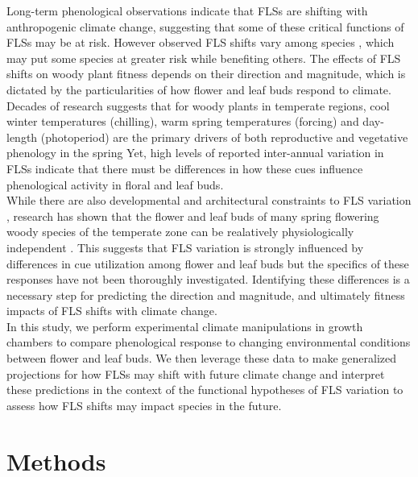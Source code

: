 \documentclass[11pt]{article}
\begin{document}
\noindent Long-term phenological observations indicate that FLSs are shifting with anthropogenic climate change, suggesting that some of these critical functions of FLSs may be at risk. However observed FLS shifts vary among species \citep{Buonaiuto2020}, which may put some species at greater risk while benefiting others. The effects of FLS shifts on woody plant fitness depends on their direction and magnitude, which is dictated by the particularities of how flower and leaf buds respond to climate.\\ 

\noindent Decades of research suggests that for woody plants in temperate regions, cool winter temperatures (chilling), warm spring temperatures (forcing) and day-length (photoperiod) are the primary drivers of both reproductive and vegetative phenology in the spring \citep{Forrest2010,Flynn2018}  Yet, high levels of reported inter-annual variation in FLSs \citep{Buonaiuto2020} indicate that there must be differences in how these cues influence phenological activity in floral and leaf buds.\\
 
\noindent While there are also developmental and architectural constraints to FLS variation \citep{Diggle1995,Lechowicz_1995}, research has shown that the flower and leaf buds of many spring flowering woody species of the temperate zone can be realatively physiologically independent \citep{Savage2019}. This suggests that FLS variation is strongly influenced by differences in cue utilization among flower and leaf buds but the specifics of these responses have not been thoroughly investigated. Identifying these differences is a necessary step for predicting the direction and magnitude, and ultimately fitness impacts of FLS shifts with climate change.\\

\noindent In this study, we perform experimental climate manipulations in growth chambers to compare phenological response to changing environmental conditions between flower and leaf buds. We then leverage these data to make generalized projections for how FLSs may shift with future climate change and interpret these predictions in the context of the functional hypotheses of FLS variation to assess how FLS shifts may impact species in the future.\\  

\section*{Methods}
\end{document}
